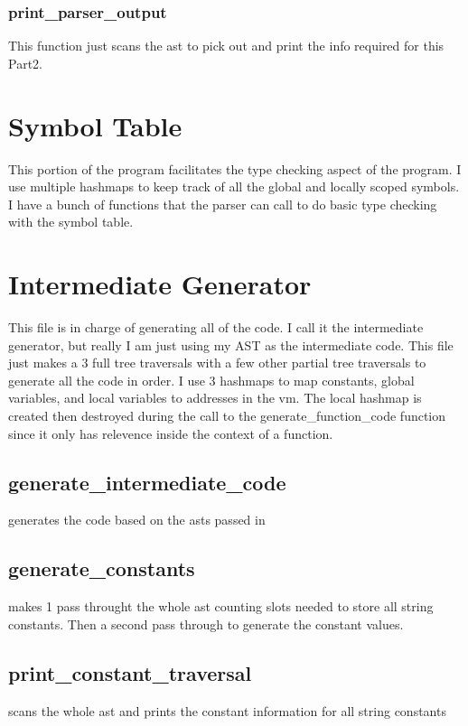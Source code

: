 \documentclass[11pt]{article}
\begin{document}
            \subsubsection{print\_parser\_output}
                This function just scans the ast to pick out and print the info required for this Part2.

    \section{Symbol Table}

        This portion of the program facilitates the type checking aspect of the program.
        I use multiple hashmaps to keep track of all the global and locally scoped symbols.
        I have a bunch of functions that the parser can call to do basic type checking with the
        symbol table.

    \section{Intermediate Generator}
        This file is in charge of generating all of the code. I call it the intermediate generator,
        but really I am just using my AST as the intermediate code. This file just makes a 3 full
        tree traversals with a few other partial tree traversals to generate all the code in order.
        I use 3 hashmaps to map constants, global variables, and local variables to addresses in 
        the vm. The local hashmap is created then destroyed during the call to the 
        generate\_function\_code function since it only has relevence inside the context of a function.

        \subsection{generate\_intermediate\_code}
            generates the code based on the asts passed in

        \subsection{generate\_constants}
            makes 1 pass throught the whole ast counting slots
            needed to store all string constants. Then a second
            pass through to generate the constant values.

        \subsection{print\_constant\_traversal}
            scans the whole ast and prints the constant information 
            for all string constants
\end{document}
